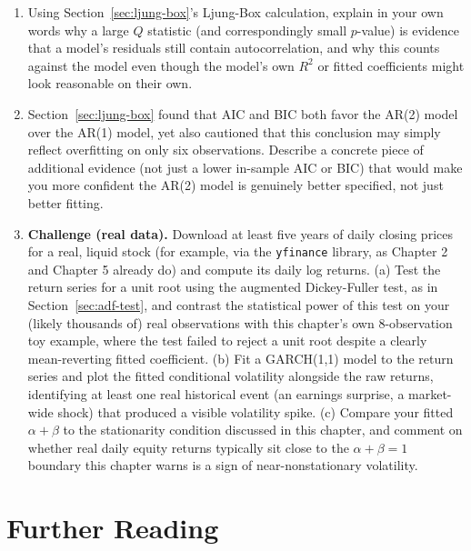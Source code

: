 \documentclass[../ai_in_finance]{subfiles}
\begin{document}
\begin{enumerate}
    \item Using Section~\ref{sec:ljung-box}'s Ljung-Box calculation, explain in your own words why a large $Q$ statistic (and correspondingly small $p$-value) is evidence that a model's residuals still contain autocorrelation, and why this counts against the model even though the model's own $R^2$ or fitted coefficients might look reasonable on their own.
    \item Section~\ref{sec:ljung-box} found that AIC and BIC both favor the AR(2) model over the AR(1) model, yet also cautioned that this conclusion may simply reflect overfitting on only six observations. Describe a concrete piece of additional evidence (not just a lower in-sample AIC or BIC) that would make you more confident the AR(2) model is genuinely better specified, not just better fitting.
    \item \textbf{Challenge (real data).} Download at least five years of daily closing prices for a real, liquid stock (for example, via the \texttt{yfinance} library, as Chapter 2 and Chapter 5 already do) and compute its daily log returns. (a) Test the return series for a unit root using the augmented Dickey-Fuller test, as in Section~\ref{sec:adf-test}, and contrast the statistical power of this test on your (likely thousands of) real observations with this chapter's own 8-observation toy example, where the test failed to reject a unit root despite a clearly mean-reverting fitted coefficient. (b) Fit a GARCH(1,1) model to the return series and plot the fitted conditional volatility alongside the raw returns, identifying at least one real historical event (an earnings surprise, a market-wide shock) that produced a visible volatility spike. (c) Compare your fitted $\alpha+\beta$ to the stationarity condition discussed in this chapter, and comment on whether real daily equity returns typically sit close to the $\alpha+\beta=1$ boundary this chapter warns is a sign of near-nonstationary volatility.
\end{enumerate}

\section{Further Reading}
\end{document}
